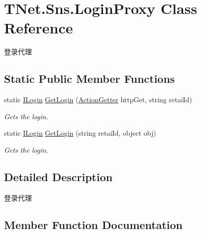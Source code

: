 \hypertarget{class_t_net_1_1_sns_1_1_login_proxy}{}\section{T\+Net.\+Sns.\+Login\+Proxy Class Reference}
\label{class_t_net_1_1_sns_1_1_login_proxy}


登录代理  


\subsection*{Static Public Member Functions}
\begin{DoxyCompactItemize}
\item 
static \mbox{\hyperlink{interface_t_net_1_1_sns_1_1_i_login}{I\+Login}} \mbox{\hyperlink{class_t_net_1_1_sns_1_1_login_proxy_a18c0b06234839f9de8b3c456950477b5}{Get\+Login}} (\mbox{\hyperlink{class_t_net_1_1_service_1_1_action_getter}{Action\+Getter}} http\+Get, string retai\+Id)
\begin{DoxyCompactList}\small\item\em Gets the login. \end{DoxyCompactList}\item 
static \mbox{\hyperlink{interface_t_net_1_1_sns_1_1_i_login}{I\+Login}} \mbox{\hyperlink{class_t_net_1_1_sns_1_1_login_proxy_a08e1676ec0b525d64e383e30f546e54a}{Get\+Login}} (string retai\+Id, object obj)
\begin{DoxyCompactList}\small\item\em Gets the login. \end{DoxyCompactList}\end{DoxyCompactItemize}


\subsection{Detailed Description}
登录代理 



\subsection{Member Function Documentation}
\mbox{\label{class_t_net_1_1_sns_1_1_login_proxy_a18c0b06234839f9de8b3c456950477b5}} 
